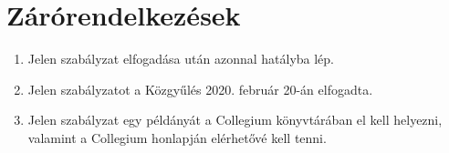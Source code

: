 \documentclass{../styles/rulebook}
\begin{document}
\section{Zárórendelkezések}

\begin{enumerate}
	\item Jelen szabályzat elfogadása után azonnal hatályba lép.
	\item Jelen szabályzatot a Közgyűlés 2020. február 20-án elfogadta.
	\item Jelen szabályzat egy példányát a Collegium könyvtárában el kell helyezni, valamint a Collegium honlapján elérhetővé kell tenni.
\end{enumerate}
\end{document}

